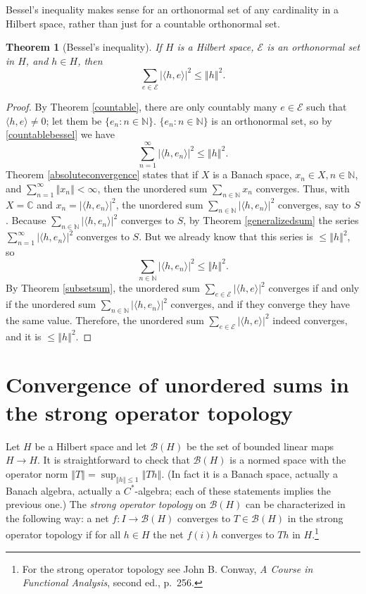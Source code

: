 \documentclass{article}
\newcommand{\inner}[2]{\langle #1, #2 \rangle}
\newcommand{\norm}[1]{\left\Vert #1 \right\Vert}
\newtheorem{theorem}{Theorem}
\begin{document}
Bessel's inequality makes sense for an orthonormal set of any cardinality in a Hilbert space, rather than just for a countable orthonormal set.


\begin{theorem}[Bessel's inequality]
If $H$ is a Hilbert space, $\mathscr{E}$ is an orthonormal set in $H$, and $h \in H$, then
\[
\sum_{e \in \mathscr{E}} |\inner{h}{e}|^2 \leq \norm{h}^2.
\]
\label{bessel}
\end{theorem}
\begin{proof}
By Theorem \ref{countable}, there are only countably many $e \in \mathscr{E}$ such that $\inner{h}{e} \neq 0$; let them be $\{e_n: n \in \mathbb{N}\}$. 
$\{e_n: n \in \mathbb{N}\}$ is an orthonormal set, so by \eqref{countablebessel} we have 
\[
\sum_{n=1}^\infty |\inner{h}{e_n}|^2 \leq \norm{h}^2.
\]
Theorem \ref{absoluteconvergence} states that if $X$ is a Banach space, $x_n \in X, n \in \mathbb{N}$, and
$\sum_{n=1}^\infty \norm{x_n} < \infty$, then the unordered sum $\sum_{n \in \mathbb{N}} x_n$ converges. Thus, with
$X=\mathbb{C}$ and $x_n=|\inner{h}{e_n}|^2$, the unordered sum $\sum_{n \in \mathbb{N}} |\inner{h}{e_n}|^2$ converges, say to $S$.
Because  $\sum_{n \in \mathbb{N}} |\inner{h}{e_n}|^2$ converges  to $S$, by Theorem \ref{generalizedsum} the series
$\sum_{n=1}^\infty |\inner{h}{e_n}|^2$ converges to $S$. But 
we already know that this series is $\leq \norm{h}^2$, so
\[
\sum_{n \in \mathbb{N}} |\inner{h}{e_n}|^2 \leq \norm{h}^2.
\]
By Theorem \ref{subsetsum}, the unordered sum $\sum_{e \in \mathscr{E}} |\inner{h}{e}|^2$ converges if and only if
the unordered sum  $\sum_{n \in \mathbb{N}} |\inner{h}{e_n}|^2$ converges, and if they converge they have the same value.
Therefore,  the unordered sum $\sum_{e \in \mathscr{E}} |\inner{h}{e}|^2$ indeed converges, and it is $\leq \norm{h}^2$.
\end{proof}


\section{Convergence of unordered sums in the strong operator topology}
Let $H$ be a Hilbert space and let $\mathscr{B}(H)$ be the set of bounded linear maps $H \to H$. It is straightforward to check that
$\mathscr{B}(H)$ is a normed space with
the operator norm $\norm{T} = \sup_{\norm{h} \leq 1} \norm{Th}$. (In fact it is a Banach space, actually a Banach algebra, actually
a $C^*$-algebra; each of these statements implies the previous one.) The {\em strong operator topology} on $\mathscr{B}(H)$ can be characterized
in the following way: a net $f:I \to \mathscr{B}(H)$ converges to $T \in \mathscr{B}(H)$ in the strong operator topology if for all
$h \in H$ the net $f(i)h$ converges to $Th$ in $H$.\footnote{For the strong operator topology see John B. Conway, {\em A Course in Functional Analysis}, second ed.,
p.~256.}
\end{document}
